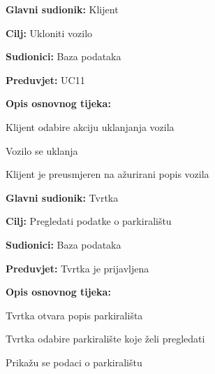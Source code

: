 \noindent {}
\begin{packed_item}
	
	\item \textbf{Glavni sudionik:} Klijent
	\item \textbf{Cilj:} Ukloniti vozilo
	\item \textbf{Sudionici:} Baza podataka
	\item \textbf{Preduvjet:} UC11
	\item \textbf{Opis osnovnog tijeka:}
	
	\item[] \begin{packed_enum}
		
		\item Klijent odabire akciju uklanjanja vozila
		\item Vozilo se uklanja
		\item Klijent je preusmjeren na ažurirani popis vozila

	\end{packed_enum}
\end{packed_item}

\pagebreak

\noindent {}
\begin{packed_item}
	
	\item \textbf{Glavni sudionik: } Tvrtka
	\item \textbf{Cilj:} Pregledati podatke o parkiralištu
	\item \textbf{Sudionici:} Baza podataka
	\item \textbf{Preduvjet:} Tvrtka je prijavljena
	\item \textbf{Opis osnovnog tijeka:}
	
	\item[] \begin{packed_enum}
		
		\item Tvrtka otvara popis parkirališta
		\item Tvrtka odabire parkiralište koje želi pregledati
		\item Prikažu se podaci o parkiralištu
	
	\end{packed_enum}
\end{packed_item}

